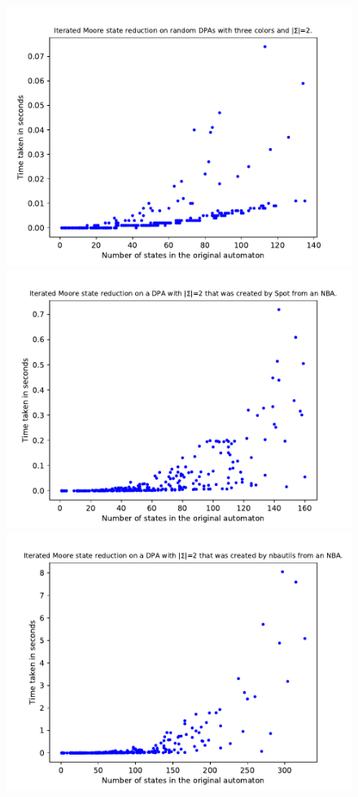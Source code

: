 \begin{figure}
	\centering
	\begin{minipage}{0.49\textwidth}
		\includegraphics[page=1,height=.3\textheight]{../data/analysis/iterated_moore/gendet_ap1.pdf} 
		\includegraphics[page=1,height=.3\textheight]{../data/analysis/iterated_moore/detspot_ap1.pdf} 
		\includegraphics[page=1,height=.3\textheight]{../data/analysis/iterated_moore/detnbaut_ap1.pdf} 

\end{minipage}
\end{figure}
